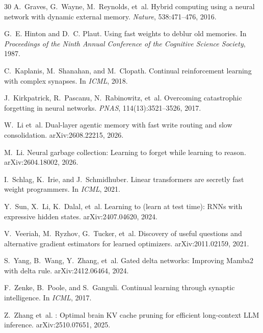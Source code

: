 \documentclass[10pt,twocolumn]{article}
\theoremstyle{definition}
\begin{document}
\begin{thebibliography}{30}
A.~Graves, G.~Wayne, M.~Reynolds, et~al.
\newblock Hybrid computing using a neural network with dynamic external memory.
\newblock \emph{Nature}, 538:471--476, 2016.

G.~E. Hinton and D.~C. Plaut.
\newblock Using fast weights to deblur old memories.
\newblock In \emph{Proceedings of the Ninth Annual Conference of the Cognitive Science Society}, 1987.

C.~Kaplanis, M.~Shanahan, and M.~Clopath.
\newblock Continual reinforcement learning with complex synapses.
\newblock In \emph{ICML}, 2018.

J.~Kirkpatrick, R.~Pascanu, N.~Rabinowitz, et~al.
\newblock Overcoming catastrophic forgetting in neural networks.
\newblock \emph{PNAS}, 114(13):3521--3526, 2017.

W.~Li et~al.
\newblock Dual-layer agentic memory with fast write routing and slow consolidation.
\newblock arXiv:2608.22215, 2026.

M.~Li.
\newblock Neural garbage collection: Learning to forget while learning to reason.
\newblock arXiv:2604.18002, 2026.

I.~Schlag, K.~Irie, and J.~Schmidhuber.
\newblock Linear transformers are secretly fast weight programmers.
\newblock In \emph{ICML}, 2021.

Y.~Sun, X.~Li, K.~Dalal, et~al.
\newblock Learning to (learn at test time): {RNNs} with expressive hidden states.
\newblock arXiv:2407.04620, 2024.

V.~Veeriah, M.~Ryzhov, G.~Tucker, et~al.
\newblock Discovery of useful questions and alternative gradient estimators for learned optimizers.
\newblock arXiv:2011.02159, 2021.

S.~Yang, B.~Wang, Y.~Zhang, et~al.
\newblock Gated delta networks: Improving {Mamba2} with delta rule.
\newblock arXiv:2412.06464, 2024.

F.~Zenke, B.~Poole, and S.~Ganguli.
\newblock Continual learning through synaptic intelligence.
\newblock In \emph{ICML}, 2017.

Z.~Zhang et~al.
: Optimal brain {KV} cache pruning for efficient long-context {LLM} inference.
\newblock arXiv:2510.07651, 2025.

\end{thebibliography}
\end{document}

